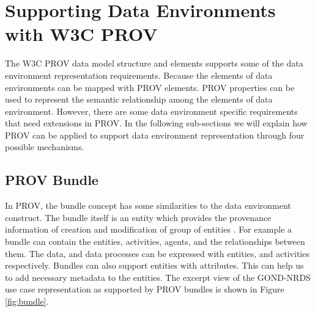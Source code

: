 

\section{Supporting Data Environments with W3C PROV} \label{sec:impl}
The W3C PROV data model structure and elements supports some of the data environment representation requirements. Because the elements of data environments can be mapped with PROV elements. PROV  properties can be used to represent the semantic relationship among the elements of data environment. However, there are some data environment specific requirements  that need extensions in PROV. In the following sub-sections we will explain how PROV can be applied to support data environment representation through four possible mechanisms.

\subsection{PROV Bundle}
In PROV, the bundle concept has some similarities to the data environment construct. %
The bundle itself is an entity which provides the provenance information of creation and modification of group of entities \cite{mckenna2019modelling}. 
For example a bundle can contain the entities, activities, agents, and the relationships between them. %
The  data, and data processes can be expressed with entities, and activities respectively. Bundles can also support entities with attributes. This can help us to add necessary metadata to the entities. 
The excerpt view of the GOND-NRDS use case representation as supported by PROV bundles is shown in Figure \ref {fig:bundle}.

